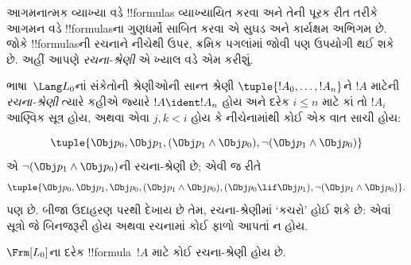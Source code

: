 \documentclass[../../../include/open-logic-section]{subfiles}
\begin{document}


આગમનાત્મક વ્યાખ્યા વડે !!{formula}s વ્યાખ્યાયિત કરવા અને તેની
પૂરક રીત તરીકે આગમન વડે !!{formula}sના ગુણધર્મો સાબિત કરવા એ
સુઘડ અને કાર્યક્ષમ અભિગમ છે. જોકે !!{formula}sની રચનાને નીચેથી ઉપર,
ક્રમિક પગલાંમાં જોવી પણ ઉપયોગી થઈ શકે છે. અહીં આપણે \emph{રચના-શ્રેણી}
એ ખ્યાલ વડે એમ કરીશું.

\begin{defn}[સૂત્રો માટેની રચના-શ્રેણીઓ]
ભાષા~$\Lang L_0$નાં સંકેતોની શ્રેણીઓની સાન્ત શ્રેણી
$\tuple{!A_0,\dotsc,!A_n}$ને $!A$ માટેની \emph{રચના-શ્રેણી} ત્યારે
કહીએ જ્યારે $!A \ident !A_n$ હોય અને દરેક $i\leq n$ માટે કાં તો
$!A_i$ આણ્વિક સૂત્ર હોય, અથવા એવા $j,k<i$ હોય કે નીચેનામાંથી કોઈ
એક વાત સાચી હોય:
\begin{enumerate}
\end{enumerate}
\end{defn}

\begin{ex}
\[
\tuple{
    \Obj p_0,
    \Obj p_1,
    (\Obj p_1 \land \Obj p_0),
    \lnot (\Obj p_1 \land \Obj p_0)
}
\]
એ $\lnot (\Obj p_1 \land \Obj p_0)$ની રચના-શ્રેણી છે; એવી જ રીતે
\[
\tuple{
    \Obj p_0,
    \Obj p_1,
    \Obj p_0,
    (\Obj p_1 \land \Obj p_0),
    (\Obj p_0 \lif \Obj p_1),
    \lnot (\Obj p_1 \land \Obj p_0)
}.
\]
પણ છે.
બીજા ઉદાહરણ પરથી દેખાય છે તેમ, રચના-શ્રેણીમાં `કચરો' હોઈ શકે છે:
એવાં સૂત્રો જે બિનજરૂરી હોય અથવા રચનામાં કોઈ ફાળો આપતાં ન હોય.
\end{ex}

\begin{prop}
$\Frm[L_0]$ના દરેક !!{formula}~$!A$ માટે કોઈ રચના-શ્રેણી હોય છે.
\end{prop}
\end{document}
